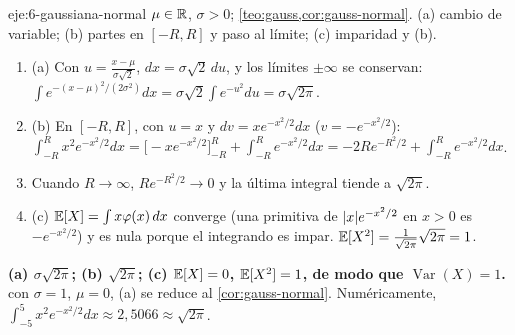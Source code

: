 \begin{solucion}{eje:6-gaussiana-normal}
\datos $\mu\in\mathbb{R}$, $\sigma>0$; \cref{teo:gauss,cor:gauss-normal}.
\planteamiento (a) cambio de variable; (b) partes en $[-R,R]$ y paso al límite; (c) imparidad y (b).
\pasos
\begin{enumerate}[label=\arabic*.]
  \item (a) Con $u=\frac{x-\mu}{\sigma\sqrt2}$, $dx=\sigma\sqrt2\,du$, y los límites $\pm\infty$ se conservan: $\int e^{-(x-\mu)^2/(2\sigma^2)}dx=\sigma\sqrt2\int e^{-u^2}du=\sigma\sqrt{2\pi}$.
  \item (b) En $[-R,R]$, con $u=x$ y $dv=xe^{-x^2/2}dx$ ($v=-e^{-x^2/2}$): $\int_{-R}^{R}x^2e^{-x^2/2}dx=\bigl[-xe^{-x^2/2}\bigr]_{-R}^{R}+\int_{-R}^{R}e^{-x^2/2}dx=-2Re^{-R^2/2}+\int_{-R}^{R}e^{-x^2/2}dx$.
  \item Cuando $R\to\infty$, $Re^{-R^2/2}\to0$ y la última integral tiende a $\sqrt{2\pi}$.
  \item (c) $\mathbb{E}[X]=\int x\varphi(x)\,dx$ converge (una primitiva de $\lvert x\rvert e^{-x^2/2}$ en $x>0$ es $-e^{-x^2/2}$) y es nula porque el integrando es impar. $\mathbb{E}[X^2]=\frac{1}{\sqrt{2\pi}}\sqrt{2\pi}=1$.
\end{enumerate}
\resultado \textbf{(a) $\sigma\sqrt{2\pi}$; (b) $\sqrt{2\pi}$; (c) $\mathbb{E}[X]=0$, $\mathbb{E}[X^2]=1$, de modo que $\operatorname{Var}(X)=1$.}
\comprobacion con $\sigma=1$, $\mu=0$, (a) se reduce al \cref{cor:gauss-normal}. Numéricamente, $\int_{-5}^{5}x^2e^{-x^2/2}dx\approx2{,}5066\approx\sqrt{2\pi}$.
\end{solucion}
